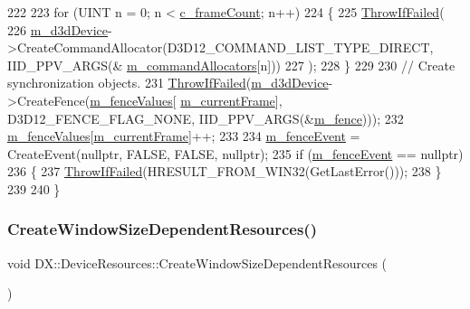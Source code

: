 \begin{DoxyCode}
222 
223     \textcolor{keywordflow}{for} (UINT n = 0; n < \mbox{\hyperlink{namespace_d_x_a13eecb6f150dc97fc5c7c8597377d0fb}{c\_frameCount}}; n++)
224     \{
225         \mbox{\hyperlink{_direct_x_helper_8h_abca3eeca6b5772a1112e0a9a9e3d9013}{ThrowIfFailed}}(
226             \mbox{\hyperlink{class_d_x_1_1_device_resources_ac883ca593d5c03fe20d5865cb033cee1}{m\_d3dDevice}}->CreateCommandAllocator(D3D12\_COMMAND\_LIST\_TYPE\_DIRECT, IID\_PPV\_ARGS(&
      \mbox{\hyperlink{class_d_x_1_1_device_resources_afdaf82b33be14ee78ab6e540f4b63785}{m\_commandAllocators}}[n]))
227         );
228     \}
229 
230     \textcolor{comment}{// Create synchronization objects.}
231     \mbox{\hyperlink{_direct_x_helper_8h_abca3eeca6b5772a1112e0a9a9e3d9013}{ThrowIfFailed}}(\mbox{\hyperlink{class_d_x_1_1_device_resources_ac883ca593d5c03fe20d5865cb033cee1}{m\_d3dDevice}}->CreateFence(\mbox{\hyperlink{class_d_x_1_1_device_resources_a393281583e4e020d7a2d05c060c588a8}{m\_fenceValues}}[
      \mbox{\hyperlink{class_d_x_1_1_device_resources_ac5373e60722eaa25c1068aa754b501fa}{m\_currentFrame}}], D3D12\_FENCE\_FLAG\_NONE, IID\_PPV\_ARGS(&\mbox{\hyperlink{class_d_x_1_1_device_resources_a147e6a63f6a733dc64c766c472d29d20}{m\_fence}})));
232     \mbox{\hyperlink{class_d_x_1_1_device_resources_a393281583e4e020d7a2d05c060c588a8}{m\_fenceValues}}[\mbox{\hyperlink{class_d_x_1_1_device_resources_ac5373e60722eaa25c1068aa754b501fa}{m\_currentFrame}}]++;
233 
234     \mbox{\hyperlink{class_d_x_1_1_device_resources_af3ecc18e8cf542dbcbd33872605e1b62}{m\_fenceEvent}} = CreateEvent(\textcolor{keyword}{nullptr}, FALSE, FALSE, \textcolor{keyword}{nullptr});
235     \textcolor{keywordflow}{if} (\mbox{\hyperlink{class_d_x_1_1_device_resources_af3ecc18e8cf542dbcbd33872605e1b62}{m\_fenceEvent}} == \textcolor{keyword}{nullptr})
236     \{
237         \mbox{\hyperlink{_direct_x_helper_8h_abca3eeca6b5772a1112e0a9a9e3d9013}{ThrowIfFailed}}(HRESULT\_FROM\_WIN32(GetLastError()));
238     \}
239 
240 \}
\end{DoxyCode}
\mbox{\label{class_d_x_1_1_device_resources_a9556306971d5484caaa5a2aac42f253e}} 
\subsubsection{\texorpdfstring{Create\+Window\+Size\+Dependent\+Resources()}{CreateWindowSizeDependentResources()}}
{\footnotesize\ttfamily void D\+X\+::\+Device\+Resources\+::\+Create\+Window\+Size\+Dependent\+Resources (\begin{DoxyParamCaption}{ }\end{DoxyParamCaption})\hspace{0.3cm}{\ttfamily [private]}}



